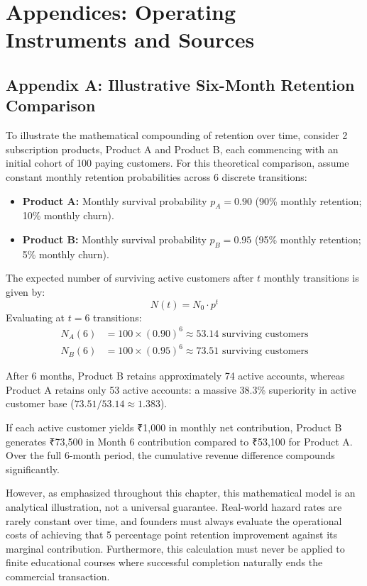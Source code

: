 \section*{Appendices: Operating Instruments and Sources}

\subsection*{Appendix A: Illustrative Six-Month Retention Comparison}

To illustrate the mathematical compounding of retention over time, consider 2 subscription products, Product A and Product B, each commencing with an initial cohort of 100 paying customers. For this theoretical comparison, assume constant monthly retention probabilities across 6 discrete transitions:
\begin{itemize}[leftmargin=*]
\item \textbf{Product A:} Monthly survival probability $p_A = 0.90$ (90\% monthly retention; 10\% monthly churn).
\item \textbf{Product B:} Monthly survival probability $p_B = 0.95$ (95\% monthly retention; 5\% monthly churn).
\end{itemize}

The expected number of surviving active customers after $t$ monthly transitions is given by:
\begin{equation}
N(t) = N_0 \cdot p^t
\end{equation}
Evaluating at $t = 6$ transitions:
\begin{align}
N_A(6) &= 100 \times (0.90)^6 \approx 53.14 \text{ surviving customers} \\
N_B(6) &= 100 \times (0.95)^6 \approx 73.51 \text{ surviving customers}
\end{align}

After 6 months, Product B retains approximately 74 active accounts, whereas Product A retains only 53 active accounts: a massive 38.3\% superiority in active customer base ($73.51 / 53.14 \approx 1.383$). 

If each active customer yields ₹1,000 in monthly net contribution, Product B generates ₹73,500 in Month 6 contribution compared to ₹53,100 for Product A. Over the full 6-month period, the cumulative revenue difference compounds significantly. 

However, as emphasized throughout this chapter, this mathematical model is an analytical illustration, not a universal guarantee. Real-world hazard rates are rarely constant over time, and founders must always evaluate the operational costs of achieving that 5 percentage point retention improvement against its marginal contribution. Furthermore, this calculation must never be applied to finite educational courses where successful completion naturally ends the commercial transaction.


